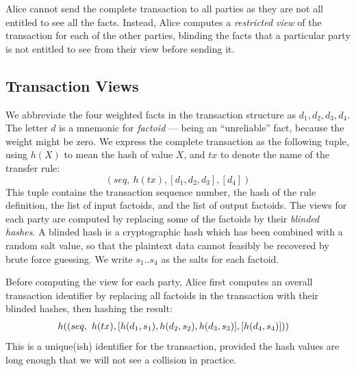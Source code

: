 Alice cannot send the complete transaction to all parties as they are not all entitled to see all the facts. Instead, Alice computes a \emph{restricted view} of the transaction for each of the other parties, blinding the facts that a particular party is not entitled to see from their view before sending it.


\subsection{Transaction Views}
We abbreviate the four weighted facts in the transaction structure as $d_1, d_2, d_3, d_4$. The letter $d$ is a mnemonic for \emph{factoid} --- being an ``unreliable'' fact, because the weight might be zero. We express the complete transaction as the following tuple, using $h(X)$ to mean the hash of value $X$, and $tx$ to denote the name of the transfer rule:
$$
 (seq,~ h(tx), [d_1, d_2, d_3], [d_4])
$$
This tuple contains the transaction sequence number, the hash of the rule definition, the list of input factoids, and the list of output factoids. The views for each party are computed by replacing some of the factoids by their \emph{blinded hashes}. A blinded hash is a cryptographic hash which has been combined with a random salt value, so that the plaintext data cannot feasibly be recovered by brute force guessing. We write $s_1 .. s_4$ as the salts for each factoid.

Before computing the view for each party, Alice first computes an overall transaction identifier by replacing all factoids in the transaction with their blinded hashes, then hashing the result:
$$
\begin{array}{rl}
 \hspace{-2ex} h((seq,~ h(tx), [h(d_1, s_1), h(d_2, s_2), h(d_3, s_3)], [h(d_4, s_4)]))
\end{array}
$$
This is a unique(ish) identifier for the transaction, provided the hash values are long enough that we will not see a collision in practice.

